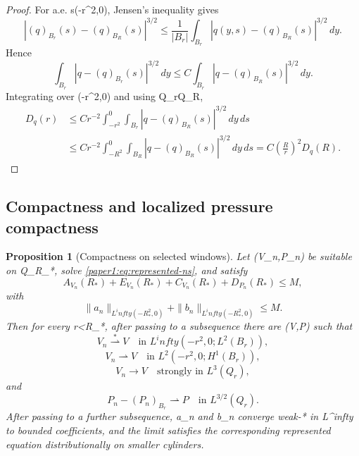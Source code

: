 \documentclass[11pt]{amsart}
\def\({}%
\def\){}%
\def\infty{infty}%
\theoremstyle{plain}
\newtheorem{proposition}[proposition]{Proposition}
\theoremstyle{definition}
\theoremstyle{remark}
\begin{document}
\begin{proof}
For a.e. \(s\in(-r^2,0)\), Jensen's inequality gives
\[
  |(q)_{B_r}(s)-(q)_{B_R}(s)|^{3/2}
  \le \frac1{|B_r|}\int_{B_r}|q(y,s)-(q)_{B_R}(s)|^{3/2}\,dy .
\]
Hence
\[
  \int_{B_r}|q-(q)_{B_r}(s)|^{3/2}\,dy
  \le
  C\int_{B_r}|q-(q)_{B_R}(s)|^{3/2}\,dy .
\]
Integrating over \((-r^2,0)\) and using \(Q_r\subset Q_R\),
\[
\begin{aligned}
  D_q(r)
  &\le
  Cr^{-2}\int_{-r^2}^0\int_{B_r}
  |q-(q)_{B_R}(s)|^{3/2}\,dy\,ds \\
  &\le
  Cr^{-2}\int_{-R^2}^0\int_{B_R}
  |q-(q)_{B_R}(s)|^{3/2}\,dy\,ds
  =
  C\left(\frac{R}{r}\right)^2D_q(R).
\end{aligned}
\]
\end{proof}

\subsection{Compactness and localized pressure compactness}

\begin{proposition}[Compactness on selected windows]\label{paper1:prop:compactness}
Let \((V_n,P_n)\) be suitable on \(Q_{R_*}\), solve \eqref{paper1:eq:represented-ns}, and satisfy
\[
  A_{V_n}(R_*)+E_{V_n}(R_*)+C_{V_n}(R_*)+D_{P_n}(R_*)\le M,
\]
with
\[
  \|a_n\|_{L^\infty(-R_*^2,0)}+\|b_n\|_{L^\infty(-R_*^2,0)}\le M.
\]
Then for every \(r<R_*\), after passing to a subsequence there are \((V,P)\)
such that
\[
  V_n\stackrel{*}{\rightharpoonup}V
  \quad\text{in }L^\infty(-r^2,0;L^2(B_r)),
\]
\[
  V_n\rightharpoonup V
  \quad\text{in }L^2(-r^2,0;H^1(B_r)),
\]
\[
  V_n\to V
  \quad\text{strongly in }L^3(Q_r),
\]
and
\[
  P_n-(P_n)_{B_r}\rightharpoonup P
  \quad\text{in }L^{3/2}(Q_r).
\]
After passing to a further subsequence, \(a_n\) and \(b_n\) converge weak-* in
\(L^\infty\) to bounded coefficients, and the limit satisfies the corresponding
represented equation distributionally on smaller cylinders.
\end{proposition}
\end{document}
